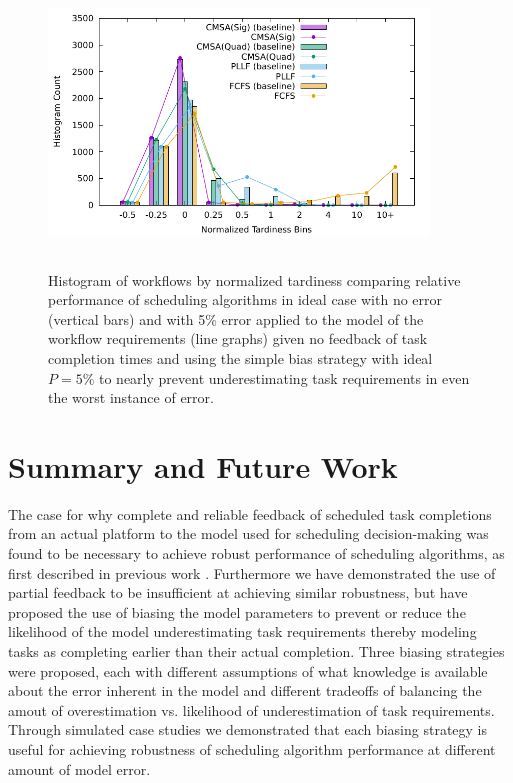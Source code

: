 \documentclass[10pt]{csce}
\begin{document}
\begin{figure}
	\begin{center}
		\includegraphics[width=0.9\textwidth,height=3in]{figures/Histogram_All_CompleteMediumAllUniformError_WithBias.pdf}
	\end{center}
	\caption{Histogram of workflows by normalized tardiness comparing
		relative performance of scheduling algorithms in ideal case with no
		error (vertical bars) and with 5\% error applied to the model of the
		workflow requirements (line graphs) given no feedback of task
		completion times and using the simple bias strategy with ideal
		$P=5\%$ to nearly prevent underestimating task requirements in even the
		worst instance of error.}
	\label{fig:nofeedback-sbias-mederror}
\end{figure}

\section{Summary and Future Work}
\label{sec:Summary}

The case for why complete and reliable feedback of scheduled task completions
from an actual platform to the model used for scheduling decision-making was
found to be necessary to achieve robust performance of scheduling algorithms,
as first described in previous work \cite{pdpta18}. Furthermore we have
demonstrated the use of partial feedback to be insufficient at achieving
similar robustness, but have proposed the use of biasing the model parameters
to prevent or reduce the likelihood of the model underestimating task
requirements thereby modeling tasks as completing earlier than their actual
completion. Three biasing strategies were proposed, each with different
assumptions of what knowledge is available about the error inherent in the
model and different tradeoffs of balancing the amout of overestimation vs.
likelihood of underestimation of task requirements.  Through simulated case
studies we demonstrated that each biasing strategy is useful for achieving
robustness of scheduling algorithm performance at different amount of model
error.
\end{document}
